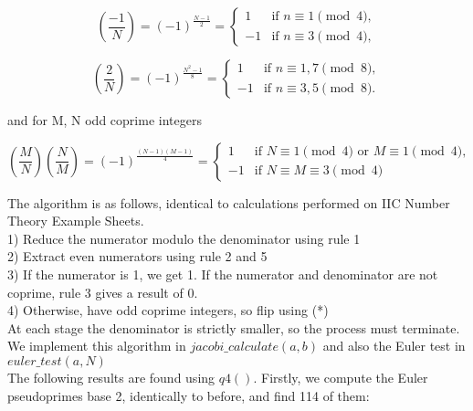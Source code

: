 \documentclass[10pt,a4paper]{report}
\newcommand{\legendre}[2]{(\frac{#1}{#2})}
\begin{document}
\begin{equation*}
\legendre{-1}{N} = (-1)^{\frac{N-1}{2}} = \begin{cases} 
1 & \text{if }n \equiv 1 \pmod 4,\\
-1 & \text{if }n \equiv 3 \pmod 4,
\end{cases}
\tag{4}
\end{equation*}

\begin{equation*}
\legendre{2}{N} = (-1)^{\frac{N^2-1}{8}} = \begin{cases} 1 & \text{if }n \equiv 1,7 \pmod 8,\\
-1 & \text{if }n \equiv 3,5\pmod 8.
\end{cases}
\tag{5}
\end{equation*}

and for M, N odd coprime integers

\begin{equation*}
\legendre{M}{N}\legendre{N}{M} = (-1)^{\frac{(N-1)(M-1)}{4}} =
\begin{cases}
1 & \text{if } N \equiv 1 \pmod 4 \text{ or } M \equiv 1 \pmod 4,\\
-1 & \text{if } N\equiv M \equiv 3 \pmod 4
\end{cases}
\tag{*}
\end{equation*}

The algorithm is as follows, identical to calculations performed on IIC Number Theory Example Sheets.\\

1) Reduce the numerator modulo the denominator using rule 1 \\
2) Extract even numerators using rule 2 and 5\\
3) If the numerator is 1, we get 1. If the numerator and denominator are not coprime, rule 3 gives a result of 0.\\
4) Otherwise, have odd coprime integers, so flip using (*)\\


At each stage the denominator is strictly smaller, so the process must terminate. We implement this algorithm in $jacobi\_calculate(a,b)$ and also the Euler test in $euler\_test(a,N)$\\


The following results are found using $q4()$. Firstly, we compute the Euler pseudoprimes base 2, identically to before, and find 114 of them:
\end{document}
